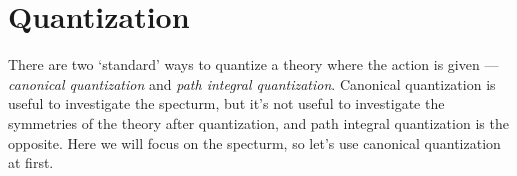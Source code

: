 \section{Quantization}

There are two `standard' ways to quantize a theory where
the action is given --- \textit{canonical quantization}
and \textit{path integral quantization}. 
Canonical quantization is useful to investigate the 
specturm, but it's not useful to investigate the symmetries
of the theory after quantization, and path integral
quantization is the opposite. Here we will focus on the
specturm, so let's use canonical quantization at first.

